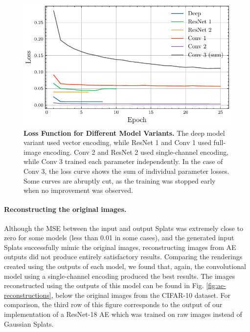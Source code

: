 \begin{figure}
    \centering    \includegraphics[width=1\linewidth]{fig/loss_curves.pdf}
    \caption{\textbf{Loss Function for Different Model Variants.} The deep model variant used vector encoding, while ResNet 1 and Conv 1 used full-image encoding. Conv 2 and ResNet 2 used single-channel encoding, while Conv 3 trained each parameter independently. In the case of Conv 3, the loss curve shows the sum of individual parameter losses. Some curves are abruptly cut, as the training was stopped early when no improvement was observed.}
    \label{fig:loss-curves}
\end{figure}

\paragraph{Reconstructing the original images.}
Although the MSE between the input and output Splats was extremely close to zero for some models (less than 0.01 in some cases), and the generated input Splats successfully mimic the original images, reconstructing images from AE outputs did not produce entirely satisfactory results. Comparing the renderings created using the outputs of each model, we found that, again, the convolutional model using a single-channel encoding produced the best results. The images reconstructed using the outputs of this model can be found in Fig. \ref{fig:ae-reconstructions}, below the original images from the CIFAR-10 dataset. For comparison, the third row of this figure corresponds to the output of our implementation of a ResNet-18 AE which was trained on raw images instead of Gaussian Splats.

